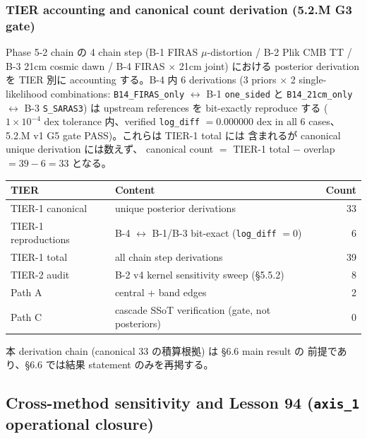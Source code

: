\documentclass[11pt,a4paper]{ltjsarticle}
\begin{document}
\subsubsection{TIER accounting and canonical count derivation (5.2.M G3 gate)}

Phase 5-2 chain の 4 chain step (B-1 FIRAS $\mu$-distortion / B-2 Plik CMB TT /
B-3 21cm cosmic dawn / B-4 FIRAS $\times$ 21cm joint) における posterior
derivation を TIER 別に accounting する。B-4 内 6 derivations
(3 priors $\times$ 2 single-likelihood combinations:
\texttt{B14\_FIRAS\_only} $\leftrightarrow$ B-1 \texttt{one\_sided} と
\texttt{B14\_21cm\_only} $\leftrightarrow$ B-3 \texttt{S\_SARAS3}) は
upstream references を bit-exactly reproduce する
($1 \times 10^{-4}$ dex tolerance 内、verified \texttt{log\_diff} $= 0.000000$
dex in all 6 cases、5.2.M v1 G5 gate PASS)。これらは TIER-1 total には
含まれるが canonical unique derivation には数えず、
canonical count $=$ TIER-1 total $-$ overlap $= 39 - 6 = 33$ となる。

\begin{center}\small
\begin{tabular}{@{}llr@{}}
\toprule
TIER & Content & Count \\
\midrule
TIER-1 canonical     & unique posterior derivations             & 33 \\
TIER-1 reproductions & B-4 $\leftrightarrow$ B-1/B-3 bit-exact (\texttt{log\_diff} $= 0$) & 6 \\
TIER-1 total         & all chain step derivations               & 39 \\
TIER-2 audit         & B-2 v4 kernel sensitivity sweep (\S 5.5.2) & 8 \\
Path A               & central + band edges                     & 2 \\
Path C               & cascade SSoT verification (gate, not posteriors) & 0 \\
\bottomrule
\end{tabular}
\end{center}

\noindent
本 derivation chain (canonical 33 の積算根拠) は \S 6.6 main result の
前提であり、\S 6.6 では結果 statement のみを再掲する。


\subsection{Cross-method sensitivity and Lesson 94 (\texttt{axis\_1} operational closure)}
\label{sec:cross-method-sensitivity}
\end{document}
